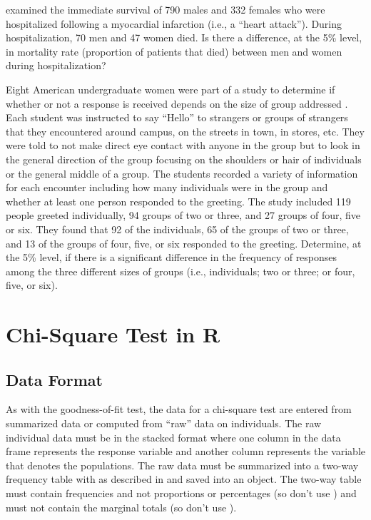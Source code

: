 \documentclass[10pt,openany]{book}\usepackage[]{graphicx}\usepackage[]{color}
\begin{document}
\begin{exsection}
  \item \label{revex:ChiMI} \cite{Fiebachetal1990} examined the immediate survival of 790 males and 332 females who were hospitalized following a myocardial infarction (i.e., a ``heart attack'').  During hospitalization, 70 men and 47 women died.  Is there a difference, at the 5\% level, in mortality rate (proportion of patients that died) between men and women during hospitalization? 

  \item \label{revex:ChiGreeting} Eight American undergraduate women were part of a study to determine if whether or not a response is received depends on the size of group addressed \citep{JonesFoshay1984}.  Each student was instructed to say ``Hello'' to strangers or groups of strangers that they encountered around campus, on the streets in town, in stores, etc.  They were told to not make direct eye contact with anyone in the group but to look in the general direction of the group focusing on the shoulders or hair of individuals or the general middle of a group.  The students recorded a variety of information for each encounter including how many individuals were in the group and whether at least one person responded to the greeting.  The study included 119 people greeted individually, 94 groups of two or three, and 27 groups of four, five or six.  They found that 92 of the individuals, 65 of the groups of two or three, and 13 of the groups of four, five, or six responded to the greeting.  Determine, at the 5\% level, if there is a significant difference in the frequency of responses among the three different sizes of groups (i.e., individuals; two or three; or four, five, or six). 
\end{exsection}


\section{Chi-Square Test in R}
\subsection{Data Format}
As with the goodness-of-fit test, the data for a chi-square test are entered from summarized data or computed from ``raw'' data on individuals.  The raw individual data must be in the stacked format where one column in the data frame represents the response variable and another column represents the variable that denotes the populations.  The raw data must be summarized into a two-way frequency table with  as described in  and saved into an object.  The two-way table must contain frequencies and not proportions or percentages (so don't use ) and must not contain the marginal totals (so don't use ).
\end{document}

